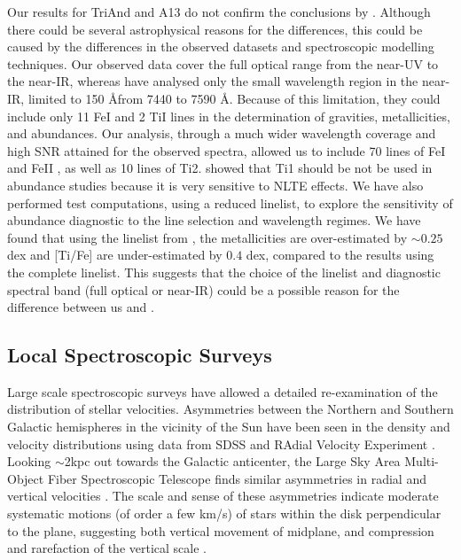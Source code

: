 \documentclass[galaxies,article,submit,moreauthors,pdftex,10pt,a4paper]{mdpi}
\newcommand{\ion}[1]{#1}
\begin{document}
Our results for TriAnd and A13 do not confirm the conclusions by \cite{chou2010b}. Although there could be several astrophysical reasons for the differences, this could be caused by the differences in the observed datasets and spectroscopic modelling techniques. Our observed data cover the full optical range from the near-UV to the near-IR, whereas \cite{chou2010b} have analysed only the small wavelength region in the near-IR, limited to 150 \AA from 7440 to 7590 \AA. Because of this limitation, they could include only 11 \ion{Fe}{I} and 2 \ion{Ti}{I} lines in the determination of gravities, metallicities, and abundances. Our analysis, through a much wider wavelength coverage and high SNR attained for the observed spectra, allowed us to include 70 lines of \ion{Fe}{I} and \ion{Fe}{II} \cite{bergemann2012}, as well as 10 lines of \ion{Ti}{2}. \cite{bergemann2011} showed that \ion{Ti}{1} should be not be used in abundance studies because it is very sensitive to NLTE effects. We have also performed test computations, using a reduced linelist, to explore the sensitivity of abundance diagnostic to the line selection and wavelength regimes. We have found that using the linelist from \cite{chou2010a}, the metallicities are over-estimated by $\sim 0.25$ dex and [Ti/Fe] are under-estimated by $0.4$ dex, compared to the results using the complete linelist. This suggests that the choice of the linelist and diagnostic spectral band (full optical or near-IR) could be a possible reason for the difference between us and \cite{chou2010}.

\subsection{Local Spectroscopic Surveys}

Large scale spectroscopic surveys have allowed a detailed re-examination of the distribution of stellar velocities.
Asymmetries between the Northern and Southern Galactic hemispheres in the vicinity of the Sun have been seen in the density and velocity distributions using data from SDSS \citep{widrow12,yanny13} and RAdial Velocity Experiment \citep[RAVE, see][]{??,williams13}.
Looking $\sim$2kpc out towards the Galactic anticenter, the Large Sky Area Multi-Object Fiber Spectroscopic Telescope \citep[LAMOST,][]{cui12,demg12,zhao12} finds similar asymmetries in radial and vertical velocities \citep{carlin13}.
The scale and sense of these asymmetries indicate moderate systematic motions (of order a few km/s)  of stars within the disk perpendicular to the plane,   suggesting both vertical movement of midplane, and compression and rarefaction of the vertical scale \citep[referred to as ``bending'' and ``breathing'' modes respectively --- see,][]{widrow14}.
\end{document}
